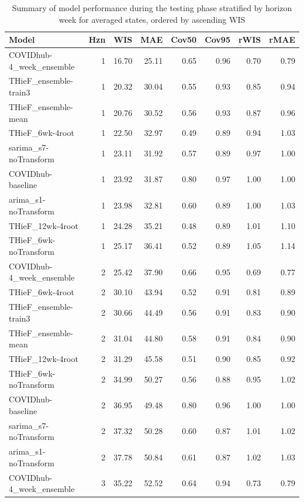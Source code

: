 \documentclass[thesis]{umassthesis}  %
\begin{document}
\begingroup\renewcommand{\arraystretch}{0.75}
\begin{longtable}{lrrrrrrr}
\caption{Summary of model performance during the testing phase stratified by horizon week for averaged states, ordered by ascending WIS} \\ 
  \hline
Model & Hzn & WIS & MAE & Cov50 & Cov95 & rWIS & rMAE \\ 
  \hline
COVIDhub-4\_week\_ensemble & 1 & 16.70 & 25.11 & 0.65 & 0.96 & 0.70 & 0.79 \\ 
  THieF\_ensemble-train3 & 1 & 20.32 & 30.04 & 0.55 & 0.93 & 0.85 & 0.94 \\ 
  THieF\_ensemble-mean & 1 & 20.76 & 30.52 & 0.56 & 0.93 & 0.87 & 0.96 \\ 
  THieF\_6wk-4root & 1 & 22.50 & 32.97 & 0.49 & 0.89 & 0.94 & 1.03 \\ 
  sarima\_s7-noTransform & 1 & 23.11 & 31.92 & 0.57 & 0.89 & 0.97 & 1.00 \\ 
  COVIDhub-baseline & 1 & 23.92 & 31.87 & 0.80 & 0.97 & 1.00 & 1.00 \\ 
  arima\_s1-noTransform & 1 & 23.98 & 32.81 & 0.60 & 0.89 & 1.00 & 1.03 \\ 
  THieF\_12wk-4root & 1 & 24.28 & 35.21 & 0.48 & 0.89 & 1.01 & 1.10 \\ 
  THieF\_6wk-noTransform & 1 & 25.17 & 36.41 & 0.52 & 0.89 & 1.05 & 1.14 \\ 
  COVIDhub-4\_week\_ensemble & 2 & 25.42 & 37.90 & 0.66 & 0.95 & 0.69 & 0.77 \\ 
  THieF\_6wk-4root & 2 & 30.10 & 43.94 & 0.52 & 0.91 & 0.81 & 0.89 \\ 
  THieF\_ensemble-train3 & 2 & 30.66 & 44.49 & 0.56 & 0.91 & 0.83 & 0.90 \\ 
  THieF\_ensemble-mean & 2 & 31.04 & 44.80 & 0.58 & 0.91 & 0.84 & 0.90 \\ 
  THieF\_12wk-4root & 2 & 31.29 & 45.58 & 0.51 & 0.90 & 0.85 & 0.92 \\ 
  THieF\_6wk-noTransform & 2 & 34.99 & 50.27 & 0.56 & 0.88 & 0.95 & 1.02 \\ 
  COVIDhub-baseline & 2 & 36.95 & 49.48 & 0.80 & 0.96 & 1.00 & 1.00 \\ 
  sarima\_s7-noTransform & 2 & 37.32 & 50.28 & 0.60 & 0.87 & 1.01 & 1.02 \\ 
  arima\_s1-noTransform & 2 & 37.78 & 50.84 & 0.61 & 0.87 & 1.02 & 1.03 \\ 
  COVIDhub-4\_week\_ensemble & 3 & 35.22 & 52.52 & 0.64 & 0.94 & 0.73 & 0.79 \\ 

\end{longtable}
\end{document}
